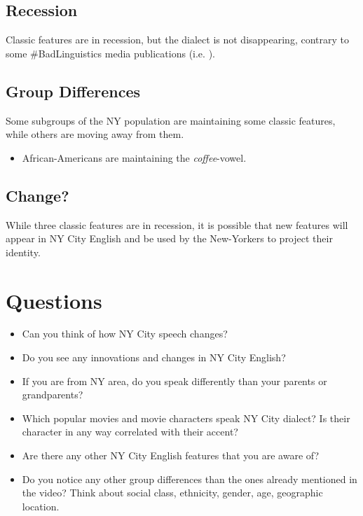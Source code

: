 \documentclass[11pt]{article}
\newcommand{\1}{$'$}
\newcommand{\2}{$''$}
\newcommand{\3}{$'''$}
\begin{document}
\subsection{Recession}

Classic features are in recession, but the dialect is not disappearing, contrary to some \#BadLinguistics media publications (i.e. \citealp{Fuhgeddaboudit:2015}).

\subsection{Group Differences}

Some subgroups of the NY population are maintaining some classic features, while others are moving away from them.

\begin{itemize}
\item African-Americans are maintaining the \emph{coffee}-vowel.	
\end{itemize}

\subsection{Change?}

While three classic features are in recession, it is possible that new features will appear in NY City English and be used by the New-Yorkers to project their identity.

\section{Questions}

\begin{itemize}
\item Can you think of how NY City speech changes? 
\item Do you see any innovations and changes in NY City English? 
\item If you are from NY area, do you speak differently than your parents or grandparents?
\item Which popular movies and movie characters speak NY City dialect? Is their character in any way correlated with their accent?
\item Are there any other NY City English features that you are aware of?
\item Do you notice any other group differences than the ones already mentioned in the video? Think about social class, ethnicity, gender, age, geographic location.
\end{itemize}








\end{document}
